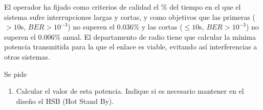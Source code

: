 El operador ha fijado como criterios de calidad el \% del tiempo en el que el sistema sufre interrupciones largas y cortas, y como objetivos que las primeras ($>10$s, $BER>10^{-3}$) no superen el $0.036\%$ y las cortas ($\leq10$s, $BER>10^{-3}$) no superen el 0.006\% anual. El departamento de radio tiene que calcular la mínima potencia transmitida para la que el enlace es viable, evitando así interferencias a otros sistemas. 
 
Se pide 
\begin{enumerate}%
\item Calcular el valor de esta potencia. Indique si es necesario mantener en el diseño el HSB (Hot Stand By).
\end{enumerate}   

